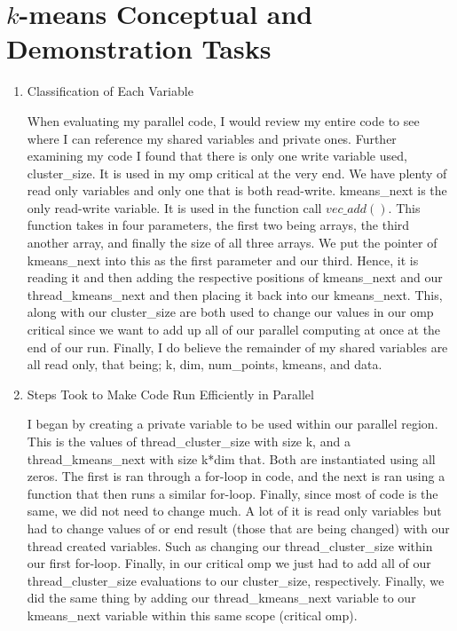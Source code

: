 \documentclass[12pt]{article}
\begin{document}

\section{$k$-means Conceptual and Demonstration Tasks} 

\begin{enumerate}
    \item Classification of Each Variable


When evaluating my parallel code, I would review my entire code to see where I can reference my shared variables and private ones. Further examining my code I found that there is only one write variable used, cluster\_size. It is used in my omp critical at the very end. We have plenty of read only variables and only one that is both read-write. kmeans\_next is the only read-write variable. It is used in the function call $vec\_add()$. This function takes in four parameters, the first two being arrays, the third another array, and finally the size of all three arrays. We put the pointer of kmeans\_next into this as the first parameter and our third. Hence, it is reading it and then adding the respective positions of kmeans\_next and our thread\_kmeans\_next and then placing it back into our kmeans\_next. This, along with our cluster\_size are both used to change our values in our omp critical since we want to add up all of our parallel computing at once at the end of our run. Finally, I do believe the remainder of my shared variables are all read only, that being; k, dim, num\_points, kmeans, and data.


    \item Steps Took to Make Code Run Efficiently in Parallel

I began by creating a private variable to be used within our parallel region. This is the values of thread\_cluster\_size with size k, and a thread\_kmeans\_next with size k*dim that. Both are instantiated using all zeros. The first is ran through a for-loop in code, and the next is ran using a function that then runs a similar for-loop. Finally, since most of code is the same, we did not need to change much. A lot of it is read only variables but had to change values of or end result (those that are being changed) with our thread created variables. Such as changing our thread\_cluster\_size within our first for-loop. Finally, in our critical omp we just had to add all of our thread\_cluster\_size evaluations to our cluster\_size, respectively. Finally, we did the same thing by adding our thread\_kmeans\_next variable to our kmeans\_next variable within this same scope (critical omp).



\end{enumerate}
\end{document}
